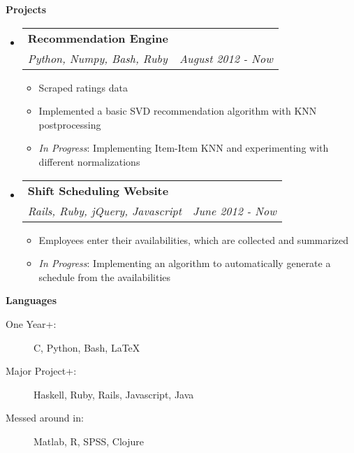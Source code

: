 \documentclass[letterpaper,11pt]{article}
\makeatletter
\newcommand{\resitem}[1]{\item #1 \vspace{-2pt}}
\newcommand{\resheading}[1]{{\large {\textbf{#1 \vphantom{p\^{E}}}}}}
\newcommand{\ressubheading}[4]{
\begin{tabular*}{6.5in}{l@{\extracolsep{\fill}}r}
		\textbf{#1} & #2 \\
			    \textit{#3} & \textit{#4} \\
\end{tabular*}\vspace{-6pt}}
\makeatother
\begin{document}
\resheading{Projects}
\begin{itemize}
\item[]
	\ressubheading{Recommendation Engine}{}{Python, Numpy, Bash, Ruby}{August 2012 - Now}
	\begin{itemize}
		\resitem{Scraped ratings data}
				\resitem{Implemented a basic SVD recommendation algorithm with KNN postprocessing}
						  \resitem{\textit{In Progress}: Implementing Item-Item KNN and experimenting with different normalizations}
								       \end{itemize}

\item[]
	\ressubheading{Shift Scheduling Website}{}{Rails, Ruby, jQuery, Javascript}{June 2012 - Now}
	\begin{itemize}
		\resitem{Employees enter their availabilities, which are collected and summarized}
				  \resitem{\textit{In Progress}: Implementing an algorithm to automatically generate a schedule from the availabilities}
				  \end{itemize}

\end{itemize}

\resheading{Languages}

\begin{description}
\item[One Year+:]
C, Python, Bash, \LaTeX
\item[Major Project+:]
Haskell, Ruby, Rails, Javascript, Java
\item[Messed around in:]
Matlab, R, SPSS, Clojure
\end{description}
\end{document}
